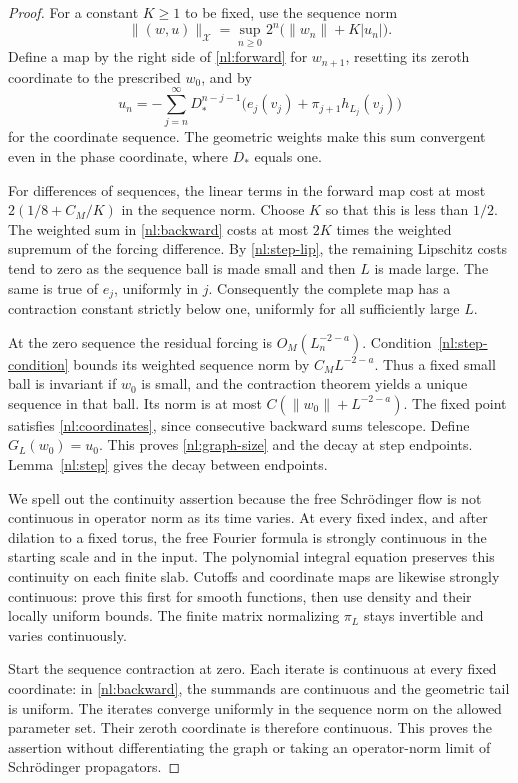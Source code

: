 \begin{proof}
For a constant $K\geq1$ to be fixed, use the sequence norm
\[
 \|(w,u)\|_{\mathcal X}
 =\sup_{n\geq0}2^n\bigl(\|w_n\|+K|u_n|\bigr).
\]
Define a map by the right side of \eqref{nl:forward} for $w_{n+1}$,
resetting its zeroth coordinate to the prescribed $w_0$, and by
\begin{equation}\label{nl:backward}
 u_n=-\sum_{j=n}^{\infty}D_*^{n-j-1}
       \bigl(e_j(v_j)+\pi_{j+1}h_{L_j}(v_j)\bigr)
\end{equation}
for the coordinate sequence. The geometric weights make this sum
convergent even in the phase coordinate, where $D_*$ equals one.

For differences of sequences, the linear terms in the forward map cost
at most $2(1/8+C_M/K)$ in the sequence norm. Choose $K$ so that this is
less than $1/2$. The weighted sum in \eqref{nl:backward} costs at most
$2K$ times the weighted supremum of the forcing difference. By
\eqref{nl:step-lip}, the remaining Lipschitz costs tend to zero as the
sequence ball is made small and then $L$ is made large. The same is true
of $e_j$, uniformly in $j$. Consequently the complete map has a
contraction constant strictly below one, uniformly for all sufficiently
large $L$.

At the zero sequence the residual forcing is $O_M(L_n^{-2-a})$.
Condition~\eqref{nl:step-condition} bounds its weighted sequence norm by
$C_M L^{-2-a}$. Thus a fixed small ball is invariant if $w_0$ is small,
and the contraction theorem yields a unique sequence in that ball.
Its norm is at most $C(\|w_0\|+L^{-2-a})$. The fixed point satisfies
\eqref{nl:coordinates}, since consecutive backward sums telescope.
Define $G_L(w_0)=u_0$. This proves \eqref{nl:graph-size} and the decay
at step endpoints. Lemma~\ref{nl:step} gives the decay between endpoints.

We spell out the continuity assertion because the free Schr\"odinger
flow is not continuous in operator norm as its time varies. At every
fixed index, and after dilation to a fixed torus, the free Fourier
formula is strongly continuous in the starting scale and in the input.
The polynomial integral equation preserves this continuity on each
finite slab. Cutoffs and coordinate maps are likewise strongly
continuous: prove this first for smooth functions, then use density and
their locally uniform bounds. The finite matrix normalizing $\pi_L$
stays invertible and varies continuously.

Start the sequence contraction at zero. Each iterate is continuous at
every fixed coordinate: in \eqref{nl:backward}, the summands are
continuous and the geometric tail is uniform. The iterates converge
uniformly in the sequence norm on the allowed parameter set. Their
zeroth coordinate is therefore continuous. This proves the assertion
without differentiating the graph or taking an operator-norm limit of
Schr\"odinger propagators.
\end{proof}

